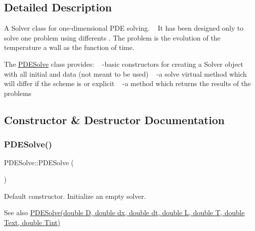 \subsection{Detailed Description}
A Solver class for one-\/dimensional P\+DE solving. ~\newline
 It has been designed only to solve one problem using differents . The problem is the evolution of the temperature  a wall as the function of time.

The \hyperlink{class_p_d_e_solve}{P\+D\+E\+Solve} class provides\+: ~\newline
-\/basic constructors for creating a Solver object with all initial  and data (not meant to be used) ~\newline
-\/a solve virtual method which will differ if the scheme is  or explicit ~\newline
-\/a method which returns the results of the problems 

\subsection{Constructor \& Destructor Documentation}
\mbox{\label{class_p_d_e_solve_ae4ffb82f6502c303f1ffdb3831cc4f6d}} 
\subsubsection{\texorpdfstring{P\+D\+E\+Solve()}{PDESolve()}\hspace{0.1cm}{\footnotesize\ttfamily [1/2]}}
{\footnotesize\ttfamily P\+D\+E\+Solve\+::\+P\+D\+E\+Solve (\begin{DoxyParamCaption}{ }\end{DoxyParamCaption})\hspace{0.3cm}{\ttfamily [inline]}}

Default constructor. Initialize an empty solver. \begin{DoxySeeAlso}{See also}
\hyperlink{class_p_d_e_solve_a1cfac8cfbb30ee0bd1c9100a5640f87f}{P\+D\+E\+Solve(double D, double dx, double dt, double L, double T, double Text, double Tint)} 
\end{DoxySeeAlso}
\mbox{\label{class_p_d_e_solve_a1cfac8cfbb30ee0bd1c9100a5640f87f}} 
